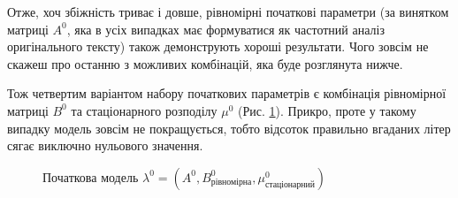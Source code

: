 Отже, хоч збіжність триває і довше, рівномірні початкові параметри (за винятком матриці $A^0$, яка в усіх випадках має формуватися як частотний аналіз оригінального тексту) також демонструють хороші результати. Чого зовсім не скажеш про останню з можливих комбінацій, яка буде розглянута нижче.

Тож четвертим варіантом набору початкових параметрів є комбінація рівномірної матриці $B^0$ та стаціонарного розподілу $\mu^0$ (Рис. \ref{figure: Buni + Minv}). Прикро, проте у такому випадку модель зовсім не покращується, тобто відсоток правильно вгаданих літер сягає виключно нульового значення.

\begin{figure}[H]
    \caption{Початкова модель $\lambda^0=(A^0,B^0_\text{рівномірна},\mu^0_\text{стаціонарний})$}
    \label{figure: Buni + Minv}
\end{figure}